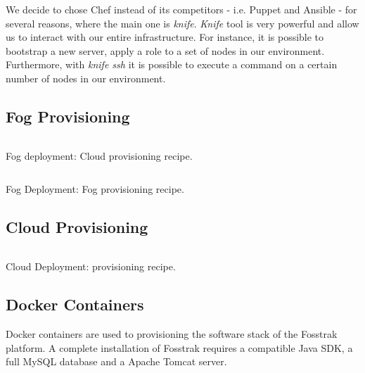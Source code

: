 We decide to chose Chef instead of its competitors - i.e. Puppet and Ansible - for several
reasons, where the main one is \textit{knife}. \textit{Knife} tool is very powerful and allow us to
interact with our entire infrastructure. For instance, it is possible to bootstrap a new server,
apply a role to a set of nodes in our environment. Furthermore, with \textit{knife ssh} it is
possible to execute a command on a certain number of nodes in our environment.

\subsection{Fog Provisioning}
\label{sub:fog_provisioning}

\begin{listing}[ht!]
  \inputminted[frame=lines,
                 framesep=3mm,
                 linenos=true,
                 xleftmargin=21pt,
                 tabsize=4]{json}{./listings/cloud_role.json}
  \caption{Fog deployment: Cloud provisioning recipe.}
  \label{listing:fog_cloud_recipe}
\end{listing}

\begin{listing}[ht!]
  \inputminted[frame=lines,
                 framesep=3mm,
                 linenos=true,
                 xleftmargin=21pt,
                 tabsize=4]{json}{./listings/fog_role.json}
  \caption{Fog Deployment: Fog provisioning recipe.}
  \label{listing:fog_fog_recipe}
\end{listing}


\subsection{Cloud Provisioning}
\label{sub:cloud_provisioning}

\begin{listing}[ht!]
  \inputminted[frame=lines,
                 framesep=3mm,
                 linenos=true,
                 xleftmargin=21pt,
                 tabsize=4]{json}{./listings/fosstrak_role.json}
  \caption{Cloud Deployment: provisioning recipe.}
  \label{listing:cloud_recipe}
\end{listing}

\subsection{Docker Containers}
\label{sub:impl_docker}
Docker containers are used to provisioning the software stack of the Fosstrak platform. A complete
installation of Fosstrak requires a compatible Java \gls{SDK}, a full MySQL database and a Apache Tomcat
server.\\

